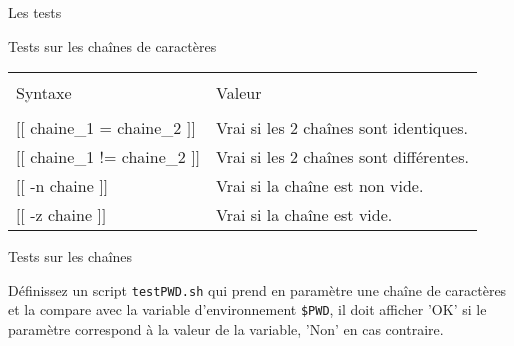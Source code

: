 \begin{frame}{Les tests}
	\begin{block}{Tests sur les chaînes de caractères}
		\begin{center}
			\begin{tabular}{ll}
				\hline\\
				Syntaxe&Valeur\\
				\hline\\
				$[[$ chaine\_1 = chaine\_2 $]]$&Vrai si les 2 chaînes sont identiques.\\[2pt]
				$[[$ chaine\_1 != chaine\_2 $]]$&Vrai si les 2 chaînes sont différentes.\\[2pt]
				$[[$ -n chaine $]]$&Vrai si la chaîne est non vide.\\[2pt]
				$[[$ -z chaine $]]$&Vrai si la chaîne est vide.\\[2pt]
				\hline
			\end{tabular}
		\end{center}
	\end{block}
	
	  \begin{exercicelet}{Tests sur les chaînes}
    \begin{questions}
    \item Définissez un script \texttt{testPWD.sh} qui prend en paramètre une chaîne de caractères et la compare avec la variable d'environnement \texttt{\$PWD}, il doit afficher 'OK' si le paramètre correspond à la valeur de la variable, 'Non' en cas contraire.
    \end{questions}
  \end{exercicelet}
  
\end{frame}

